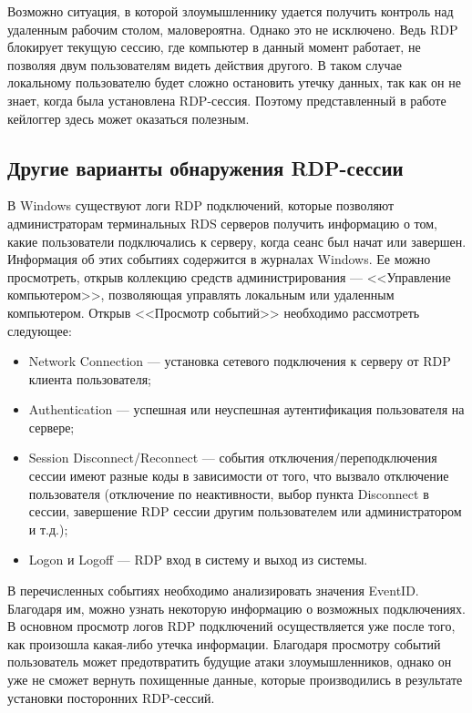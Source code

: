 \documentclass[bachelor, och, coursework]{SCWorks}
\begin{document}
  Возможно ситуация, в которой злоумышленнику удается получить контроль над удаленным рабочим столом, маловероятна. Однако это не исключено. Ведь RDP блокирует
  текущую сессию, где компьютер в данный момент работает, не позволяя двум пользователям видеть действия другого. В таком случае локальному пользователю будет сложно
  остановить утечку данных, так как он не знает, когда была установлена RDP-сессия. Поэтому представленный в работе кейлоггер здесь может оказаться полезным.

  \subsection{Другие варианты обнаружения RDP-сессии}

  В Windows существуют логи RDP подключений, которые позволяют администраторам терминальных RDS серверов получить информацию о том, какие пользователи подключались
  к серверу, когда сеанс был начат или завершен. Информация об этих событиях содержится в журналах Windows. Ее можно просмотреть, открыв коллекцию средств администрирования
  --- <<Управление компьютером>>, позволяющая управлять локальным или удаленным компьютером. Открыв <<Просмотр событий>> необходимо рассмотреть следующее:

  \begin{itemize}
    \item Network Connection ---  установка сетевого подключения к серверу от RDP клиента пользователя;
    \item Authentication --- успешная или неуспешная аутентификация пользователя на сервере;
    \item Session Disconnect/Reconnect --- события отключения/переподключения сессии имеют разные коды в зависимости от того, что вызвало отключение
    пользователя (отключение по неактивности, выбор пункта Disconnect в сессии, завершение RDP сессии другим пользователем или администратором и т.д.);
    \item Logon и Logoff --- RDP вход в систему и выход из системы. 
  \end{itemize}

  В перечисленных событиях необходимо анализировать значения EventID. Благодаря им, можно узнать некоторую информацию о возможных подключениях.
  В основном просмотр логов RDP подключений осуществляется уже после того, как произошла какая-либо утечка информации. Благодаря просмотру событий
  пользователь может предотвратить будущие атаки злоумышленников, однако он уже не сможет вернуть похищенные данные, которые производились в результате
  установки посторонних RDP-сессий.
\end{document}
